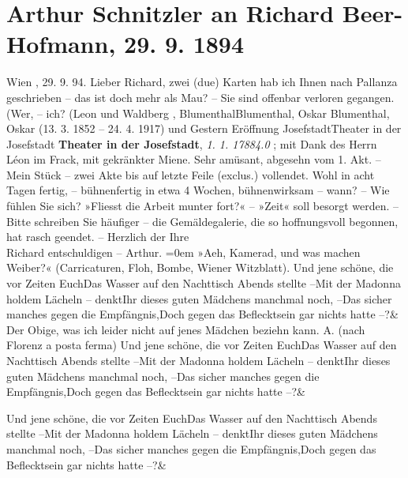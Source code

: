 \documentclass{book}
\newcommand{\stanzaend}{\&}
\begin{document}
   \section {Arthur Schnitzler an Richard Beer-Hofmann, 29. 9. 1894}  \beginnumbering
            \pstart
           Wien  , 29. 9. 94.\pend
           \pstart
           Lieber Richard, {zwei} (due) Karten hab ich Ihnen nach Pallanza  geschrieben – das ist doch mehr als Mau? – Sie sind
               offenbar verloren gegangen.\pend
           \pstart
           (Wer, – ich? (Leon   und Waldberg  , Blumenthal{Blumenthal, Oskar    {Blumenthal, Oskar} (13. 3. 1852 – 24. 4. 1917)  } und
                   \pend
           \pstart
           Gestern Eröffnung Josefstadt{Theater in der Josefstadt  \textbf{Theater in der Josefstadt}, \emph{1. 1. 17884.0}  }; mit Dank des Herrn Léon   im Frack, mit gekränkter Miene. Sehr amüsant,
               abgesehn vom 1. Akt. –\pend
           \pstart
           Mein Stück – zwei Akte bis auf
               letzte Feile (exclus.) vollendet. Wohl in acht Tagen fertig, – bühnenfertig in etwa
               4 Wochen, bühnenwirksam – wann? –\pend
           \pstart
           Wie fühlen Sie sich? »Fliesst die Arbeit munter fort?« –\pend
           \pstart
           »Zeit«
               soll besorgt werden. – Bitte schreiben Sie häufiger – die Gemäldegalerie, die so
               hoffnungsvoll begonnen, hat rasch geendet. –\pend
           \pstart
           Herzlich der Ihre{\\[\baselineskip]}  {{Richard} entschuldigen – Arthur.}\pend
           \leftskip=0em{}\pstart
           »Aeh, Kamerad, und was machen Weiber?« (Carricaturen, Floh, Bombe, Wiener
                  Witzblatt).\pend
           \stanza{}Und jene schöne, die vor Zeiten Euch\newverse{}Das Wasser auf den Nachttisch Abends stellte –\newverse{}Mit der Madonna holdem Lächeln – denkt\newverse{}Ihr dieses guten Mädchens manchmal noch, –\newverse{}Das sicher manches gegen die Empfängnis,\newverse{}Doch gegen das Beflecktsein gar nichts hatte –?\stanzaend{}\pstart
           Der Obige, was ich leider nicht auf jenes Mädchen beziehn kann.\pend
           \pstart
             {A.}\pend
           \pstart
           (nach Florenz  a posta ferma)\pend
           \endnumbering
\beginnumbering
   \stanza{}Und jene schöne, die vor Zeiten Euch\newverse{}Das Wasser auf den Nachttisch Abends stellte –\newverse{}Mit der Madonna holdem Lächeln – denkt\newverse{}Ihr dieses guten Mädchens manchmal noch, –\newverse{}Das sicher manches gegen die Empfängnis,\newverse{}Doch gegen das Beflecktsein gar nichts hatte –?\stanzaend{}
\endnumbering
\Blindtext

\beginnumbering

           \stanza{}Und jene schöne, die vor Zeiten Euch\newverse{}Das Wasser auf den Nachttisch Abends stellte –\newverse{}Mit der Madonna holdem Lächeln – denkt\newverse{}Ihr dieses guten Mädchens manchmal noch, –\newverse{}Das sicher manches gegen die Empfängnis,\newverse{}Doch gegen das Beflecktsein gar nichts hatte –?\stanzaend{}

           \endnumbering
           \Blindtext
           
\end{document}
